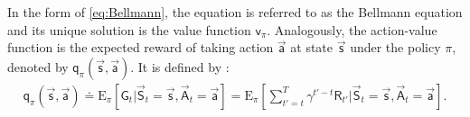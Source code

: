 In the form of \eqref{eq:Bellmann}, the equation is referred to as the Bellmann equation and its unique solution is the value function $\mathsf{v}_\pi$. Analogously, the action-value function is the expected reward of taking action $\vec{\mathsf{a}}$ at state $\vec{\mathsf{s}}$ under the policy $\pi$, denoted by $\mathsf{q}_\pi(\vec{\mathsf{s}},\vec{\mathsf{a}})$. It is defined by \cite[p. 58-59]{sutton_reinforcement_2018}:
\begin{align}
	\mathsf{q}_\pi(\vec{\mathsf{s}},\vec{\mathsf{a}}) \doteq \mathrm{E}_\pi \left[ \mathsf{G}_t \vert \vec{\mathsf{S}}_t=\vec{\mathsf{s}}, \vec{\mathsf{A}}_t=\vec{\mathsf{a}} \right] =
	\mathrm{E}_\pi \left[\sum_{t'=t}^{T}\gamma^{t'-t} \mathsf{R}_{t'} \vert \vec{\mathsf{S}}_t=\vec{\mathsf{s}}, \vec{\mathsf{A}}_t=\vec{\mathsf{a}}\right]. \label{eq:action_value_func} 
\end{align}
